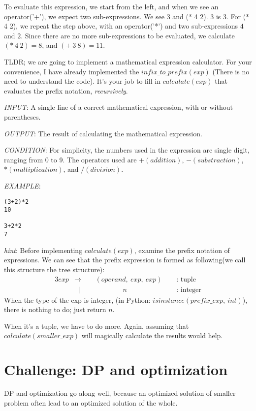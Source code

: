 \documentclass{article}
\begin{document}
To evaluate this expression, we start from the left, and when we see an
operator('+'), we expect two sub-expressions. We see $3$ and (* 4 2).
3 is 3. For (* 4 2), we repeat the step above, with an operator('*') and
two sub-expressions $4$ and $2$. Since there are no more sub-expressions to be
evaluated, we calculate $(*\ 4\ 2) = 8$, and $(+\ 3\ 8) = 11$.

TLDR; we are going to implement a mathematical expression calculator.
For your convenience, I have already implemented the $infix\_to\_prefix(exp)$
(There is no need to understand the code).
It's your job to fill in $calculate(exp)$ that evaluates the prefix notation,
\textit{recursively}.


\textit{INPUT}: A single line of a correct mathematical expression, with or
without parentheses.

\textit{OUTPUT}: The result of calculating the mathematical expression.

\textit{CONDITION}: For simplicity, the numbers used in the expression are
single digit, ranging from 0 to 9. The operators used are $+(addition)$,
$-(substraction)$, $*(multiplication)$, and $/(division)$.

\textit{EXAMPLE}:
\begin{lstlisting}
(3+2)*2
10

3+2*2
7
\end{lstlisting}

\textit{hint}: Before implementing $calculate(exp)$, examine the prefix notation
of expressions. We can see that the prefix expression is formed as following(we
call this structure the tree structure):
\begin{alignat*}{3}
  exp &\rightarrow \ \  &&(operand,\ exp,\ exp)\ \  &&\text{: tuple}\\
      &\ \ \ | &&\quad\quad\quad\quad n &&\text{: integer}
\end{alignat*}
When the type of the exp is integer, (in Python:
$isinstance(prefix\_exp,\ int)$), there
is nothing to do; just return $n$.

When it's a tuple, we have to do more. Again, assuming that
$calculate(smaller\_exp)$ will magically calculate the results would help.\\

\section{Challenge: DP and optimization}
DP and optimization go along well, because an optimized solution of smaller
problem often lead to an optimized solution of the whole.
\end{document}
